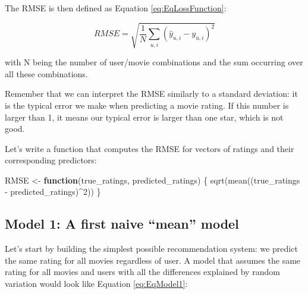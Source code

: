 \documentclass[
]{article}
\newenvironment{Shaded}{}{}
\newcommand{\ControlFlowTok}[1]{\textcolor[rgb]{0.00,0.44,0.13}{\textbf{#1}}}
\newcommand{\DecValTok}[1]{\textcolor[rgb]{0.25,0.63,0.44}{#1}}
\newcommand{\FunctionTok}[1]{\textcolor[rgb]{0.02,0.16,0.49}{#1}}
\newcommand{\NormalTok}[1]{#1}
\newcommand{\OtherTok}[1]{\textcolor[rgb]{0.00,0.44,0.13}{#1}}
\newcommand{\SpecialCharTok}[1]{\textcolor[rgb]{0.25,0.44,0.63}{#1}}
\begin{document}
The RMSE is then defined as Equation \ref{eq:EqLossFunction}:

%
\par

\label{eq:EqLossFunction} \begin{equation}
  RMSE=\sqrt{\frac{1}{N}\sum_{u,i}(\hat{y}_{u,i}-y_{u,i})^{2}}
\end{equation}

with N being the number of user/movie combinations and the sum occurring
over all these combinations.

Remember that we can interpret the RMSE similarly to a standard
deviation: it is the typical error we make when predicting a movie
rating. If this number is larger than 1, it means our typical error is
larger than one star, which is not good.

Let's write a function that computes the RMSE for vectors of ratings and
their corresponding predictors:

\begin{Shaded}
\begin{Highlighting}[]
\NormalTok{RMSE }\OtherTok{\textless{}{-}} \ControlFlowTok{function}\NormalTok{(true\_ratings, predicted\_ratings) \{}
    \FunctionTok{sqrt}\NormalTok{(}\FunctionTok{mean}\NormalTok{((true\_ratings }\SpecialCharTok{{-}}\NormalTok{ predicted\_ratings)}\SpecialCharTok{\^{}}\DecValTok{2}\NormalTok{))}
\NormalTok{\}}
\end{Highlighting}
\end{Shaded}

\newpage

\hypertarget{model-1-a-first-naive-mean-model}{%
\subsection{Model 1: A first naive ``mean''
model}\label{model-1-a-first-naive-mean-model}}

Let's start by building the simplest possible recommendation system: we
predict the same rating for all movies regardless of user. A model that
assumes the same rating for all movies and users with all the
differences explained by random variation would look like Equation
\ref{eq:EqModel1}:

%
\par
\end{document}
